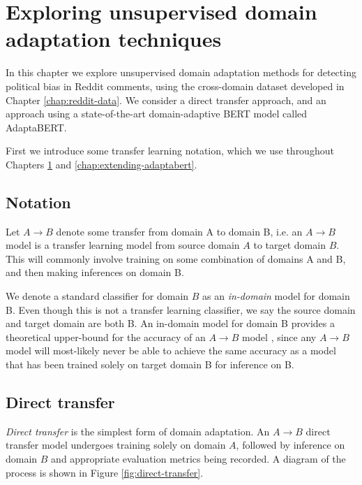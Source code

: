 \chapter{Exploring unsupervised domain adaptation techniques} \label{chap:domain-adaptation}

In this chapter we explore unsupervised domain adaptation methods for detecting political bias in Reddit comments, using the cross-domain dataset developed in Chapter \ref{chap:reddit-data}. We consider a direct transfer approach, and an approach using a state-of-the-art domain-adaptive BERT model called AdaptaBERT.

First we introduce some transfer learning notation, which we use throughout Chapters \ref{chap:domain-adaptation} and \ref{chap:extending-adaptabert}.

\section{Notation}

Let $ A \rightarrow B $ denote some transfer from domain A to domain B, i.e. an $ A \rightarrow B $ model is a transfer learning model from source domain $ A $ to target domain $ B $. This will commonly involve training on some combination of domains A and B, and then making inferences on domain B.

We denote a standard classifier for domain $ B $ as an \textit{in-domain} model for domain B. Even though this is not a transfer learning classifier, we say the source domain and target domain are both B. An in-domain model for domain B provides a theoretical upper-bound for the accuracy of an $ A \rightarrow B $ model \cite{adaptabert}, since any $ A \rightarrow B $ model will most-likely never be able to achieve the same accuracy as a model that has been trained solely on target domain B for inference on B.

\section{Direct transfer} \label{sec:direct-transfer}

\textit{Direct transfer} is the simplest form of domain adaptation. An $ A \rightarrow B $ direct transfer model undergoes training solely on domain $ A $, followed by inference on domain $ B $ and appropriate evaluation metrics being recorded. A diagram of the process is shown in Figure \ref{fig:direct-transfer}.

